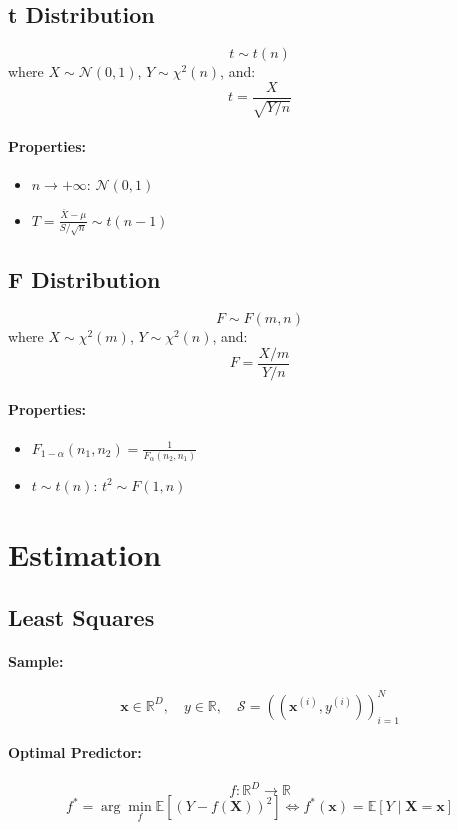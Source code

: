 \documentclass{article}
\begin{document}
\subsection{t Distribution}
\[
    t \sim t(n)
\]
where $X \sim \mathcal{N}(0,1)$, $Y \sim \chi^2(n)$, and:
\[
    t = \frac{X}{\sqrt{Y/n}}
\]
\paragraph{Properties:}
\begin{itemize}
    \item $n \rightarrow +\infty$: $\mathcal{N}(0,1)$
    \item $T = \frac{\overline{X} - \mu}{S/\sqrt{n}} \sim t(n-1)$
\end{itemize}

\subsection{F Distribution}
\[
    F \sim F(m,n)
\]
where $X \sim \chi^2(m)$, $Y \sim \chi^2(n)$, and:
\[
    F = \frac{X/m}{Y/n}
\]
\paragraph{Properties:}
\begin{itemize}
    \item $F_{1-\alpha}(n_1, n_2) = \frac{1}{F_\alpha(n_2, n_1)}$
    \item $t \sim t(n)$: $t^2 \sim F(1, n)$
\end{itemize}


\newpage
\section{Estimation}

\subsection{Least Squares}
\paragraph{Sample:}
\[
    \mathbf{x} \in \mathbb{R}^D, \quad y \in \mathbb{R}, \quad \mathcal{S} = \left( (\mathbf{x}^{(i)}, y^{(i)}) \right)_{i=1}^N
\]
\paragraph{Optimal Predictor:}
\[
    f: \mathbb{R}^D \to \mathbb{R}
\]
\[
    f^* = \arg\min_{f} \mathbb{E}[(Y-f(\mathbf{X}))^2] \Leftrightarrow f^*(\mathbf{x}) = \mathbb{E}[Y \mid \mathbf{X}=\mathbf{x}]
\]
\end{document}

